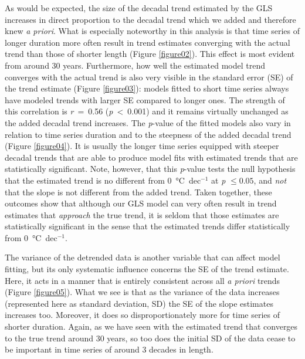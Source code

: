 \documentclass[]{ametsoc}
\begin{document}
As would be expected, the size of the decadal trend estimated by the GLS increases in direct proportion to the decadal trend which we added and therefore knew \emph{a priori}. What is especially noteworthy in this analysis is that time series of longer duration more often result in trend estimates converging with the actual trend than those of shorter length (Figure \ref{figure02}). This effect is most evident from around 30 years. Furthermore, how well the estimated model trend converges with the actual trend is also very visible in the standard error (SE) of the trend estimate (Figure \ref{figure03}): models fitted to short time series always have modeled trends with larger SE compared to longer ones. The strength of this correlation is \emph{r}~=~0.56 (\emph{p}~\textless~0.001) and it remains virtually unchanged as the added decadal trend increases. The \emph{p}-value of the fitted models also vary in relation to time series duration and to the steepness of the added decadal trend (Figure \ref{figure04}). It is usually the longer time series equipped with steeper decadal trends that are able to produce model fits with estimated trends that are statistically significant. Note, however, that this \emph{p}-value tests the null hypothesis that the estimated trend is no different from \SI{0}{\degreeCelsius}~dec$^{-1}$ at \emph{p} $\leq 0.05$, and \emph{not} that the slope is not different from the added trend. Taken together, these outcomes show that although our GLS model can very often result in trend estimates that \emph{approach} the true trend, it is seldom that those estimates are statistically significant in the sense that the estimated trends differ statistically from \SI{0}{\degreeCelsius}~dec$^{-1}$.

The variance of the detrended data is another variable that can affect model fitting, but its only systematic influence concerns the SE of the trend estimate. Here, it acts in a manner that is entirely consistent across all \emph{a priori} trends (Figure \ref{figure05}). What we see is that as the variance of the data increases (represented here as standard deviation, SD) the SE of the slope estimates increases too. Moreover, it does so disproportionately more for time series of shorter duration. Again, as we have seen with the estimated trend that converges to the true trend around 30 years, so too does the initial SD of the data cease to be important in time series of around 3 decades in length.
\end{document}
